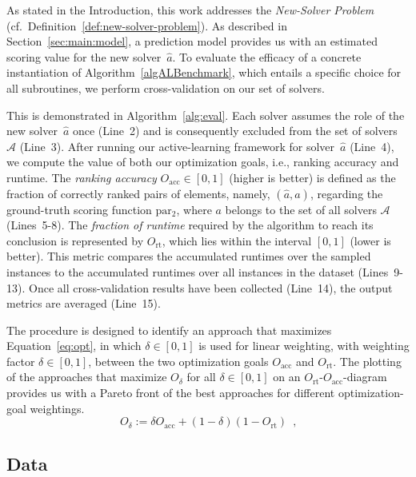 \documentclass[sn-basic, Numbered]{sn-jnl} %
\begin{document}
As stated in the Introduction, this work addresses the \emph{New-Solver Problem} (cf.~Definition~\ref{def:new-solver-problem}).
As described in Section~\ref{sec:main:model}, a prediction model provides us with an estimated scoring value for the new solver~$\hat{a}$.
To evaluate the efficacy of a concrete instantiation of Algorithm~\ref{algALBenchmark}, which entails a specific choice for all subroutines, we perform cross-validation on our set of solvers.

This is demonstrated in Algorithm~\ref{alg:eval}.
Each solver assumes the role of the new solver~$\hat{a}$ once (Line~2) and is consequently excluded from the set of solvers $\mathcal{A}$ (Line~3).
After running our active-learning framework for solver~$\hat{a}$ (Line~4), we compute the value of both our optimization goals, i.e., ranking accuracy and runtime.
The \emph{ranking accuracy} $O_{\operatorname{acc}} \in \left[0, 1\right]$ (higher is better) is defined as the fraction of correctly ranked pairs of elements, namely, $\left(\hat{a}, a\right)$, regarding the ground-truth scoring function $\operatorname{par_2}$, where $a$ belongs to the set of all solvers $\mathcal{A}$ (Lines~5-8).
The \emph{fraction of runtime} required by the algorithm to reach its conclusion is represented by $O_{\operatorname{rt}}$, which lies within the interval $[0, 1]$ (lower is better).
This metric compares the accumulated runtimes over the sampled instances to the accumulated runtimes over all instances in the dataset (Lines~9-13).
Once all cross-validation results have been collected (Line~14), the output metrics are averaged (Line~15).

The procedure is designed to identify an approach that maximizes Equation~\eqref{eq:opt}, in which $\delta \in \left[0, 1\right]$ is used for linear weighting, with weighting factor $\delta \in \left[0, 1\right]$, between the two optimization goals $O_{\operatorname{acc}}$ and $O_{\operatorname{rt}}$.
The plotting of the approaches that maximize $O_\delta$ for all $\delta \in \left[0, 1\right]$ on an $O_{\operatorname{rt}}$-$O_{\operatorname{acc}}$-diagram provides us with a Pareto front of the best approaches for different optimization-goal weightings.
%
\begin{equation}
  O_\delta := \delta O_{\operatorname{acc}} + \left(1 - \delta\right) \left(1 - O_{\operatorname{rt}}\right) \enspace \textrm{,}
  \label{eq:opt}
\end{equation} 
%

\subsection{Data}
\label{sec:exdesign:data}
\end{document}

